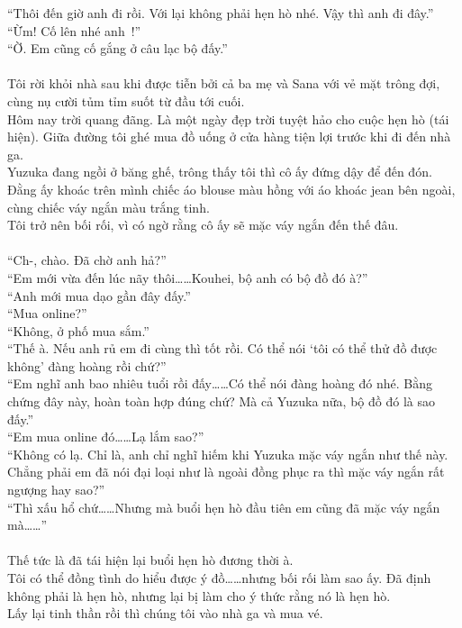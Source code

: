 \documentclass[12pt,a4paper, twosides]{book}
\begin{document}
“Thôi đến giờ anh đi rồi. Với lại không phải hẹn hò nhé. Vậy thì anh đi đây.”\\
“Ừm! Cố lên nhé anh~!”\\
“Ờ. Em cũng cố gắng ở câu lạc bộ đấy.”\\
\\
Tôi rời khỏi nhà sau khi được tiễn bởi cả ba mẹ và Sana với vẻ mặt trông đợi, cùng nụ cười tủm tỉm suốt từ đầu tới cuối.\\
Hôm nay trời quang đãng. Là một ngày đẹp trời tuyệt hảo cho cuộc hẹn hò (tái hiện). Giữa đường tôi ghé mua đồ uống ở cửa hàng tiện lợi trước khi đi đến nhà ga.\\
Yuzuka đang ngồi ở băng ghế, trông thấy tôi thì cô ấy đứng dậy để đến đón.\\
Đằng ấy khoác trên mình chiếc áo blouse màu hồng với áo khoác jean bên ngoài, cùng chiếc váy ngắn màu trắng tinh.\\
Tôi trở nên bối rối, vì có ngờ rằng cô ấy sẽ mặc váy ngắn đến thế đâu.\\
\\
“Ch-, chào. Đã chờ anh hả?”\\
“Em mới vừa đến lúc nãy thôi……Kouhei, bộ anh có bộ đồ đó à?”\\
“Anh mới mua dạo gần đây đấy.”\\
“Mua online?”\\
“Không, ở phố mua sắm.”\\
“Thế à. Nếu anh rủ em đi cùng thì tốt rồi. Có thể nói ‘tôi có thể thử đồ được không’ đàng hoàng rồi chứ?”\\
“Em nghĩ anh bao nhiêu tuổi rồi đấy……Có thể nói đàng hoàng đó nhé. Bằng chứng đây này, hoàn toàn hợp đúng chứ? Mà cả Yuzuka nữa, bộ đồ đó là sao đấy.”\\
“Em mua online đó……Lạ lắm sao?”\\
“Không có lạ. Chỉ là, anh chỉ nghĩ hiếm khi Yuzuka mặc váy ngắn như thế này. Chẳng phải em đã nói đại loại như là ngoài đồng phục ra thì mặc váy ngắn rất ngượng hay sao?”\\
“Thì xấu hổ chứ……Nhưng mà buổi hẹn hò đầu tiên em cũng đã mặc váy ngắn mà……”\\
\\
Thế tức là đã tái hiện lại buổi hẹn hò đương thời à.\\
Tôi có thể đồng tình do hiểu được ý đồ……nhưng bối rối làm sao ấy. Đã định không phải là hẹn hò, nhưng lại bị làm cho ý thức rằng nó là hẹn hò.\\
Lấy lại tinh thần rồi thì chúng tôi vào nhà ga và mua vé.\\
\end{document}
